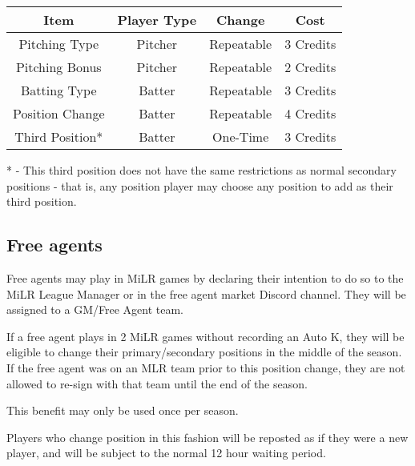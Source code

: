 \begin{center}
	\begin{tabular}{|c|c|c|c|}
		\hline 
		Item & Player Type & Change & Cost \\
		\hline 
		Pitching Type & Pitcher & Repeatable & 3 Credits \\
		\hline 
		Pitching Bonus & Pitcher & Repeatable & 2 Credits \\
        \hline 
		Batting Type & Batter & Repeatable & 3 Credits \\
        \hline 
		Position Change & Batter & Repeatable & 4 Credits \\
        \hline 
		Third Position* & Batter & One-Time & 3 Credits \\
		\hline
	\end{tabular}
\end{center}
* - This third position does not have the same restrictions as normal secondary positions - that is, any position player may choose any position to add as their third position.

\subsection{Free agents}
\label{sec:MiLR FA}
\begin{deepEnumerate}
    \item Free agents may play in MiLR games by declaring their intention to do so to the MiLR League Manager or in the free agent market Discord channel. 
    They will be assigned to a GM/Free Agent team.
    \item If a free agent plays in 2 MiLR games without recording an Auto K, they will be eligible to change their primary/secondary positions in the middle of the season. 
    If the free agent was on an MLR team prior to this position change, they are not allowed to re-sign with that team until the end of the season.
    \begin{deepEnumerate}
        \item This benefit may only be used once per season.
        \item Players who change position in this fashion will be reposted as if they were a new player, and will be subject to the normal 12 hour waiting period.        
    \end{deepEnumerate}
\end{deepEnumerate}
